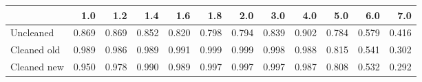\begin{tabular}{lrrrrrrrrrrr}
\toprule
{} &   1.0 &   1.2 &   1.4 &   1.6 &   1.8 &   2.0 &   3.0 &   4.0 &   5.0 &   6.0 &   7.0 \\
\midrule
Uncleaned   & 0.869 & 0.869 & 0.852 & 0.820 & 0.798 & 0.794 & 0.839 & 0.902 & 0.784 & 0.579 & 0.416 \\
Cleaned old & 0.989 & 0.986 & 0.989 & 0.991 & 0.999 & 0.999 & 0.998 & 0.988 & 0.815 & 0.541 & 0.302 \\
Cleaned new & 0.950 & 0.978 & 0.990 & 0.989 & 0.997 & 0.997 & 0.997 & 0.987 & 0.808 & 0.532 & 0.292 \\
\bottomrule
\end{tabular}
